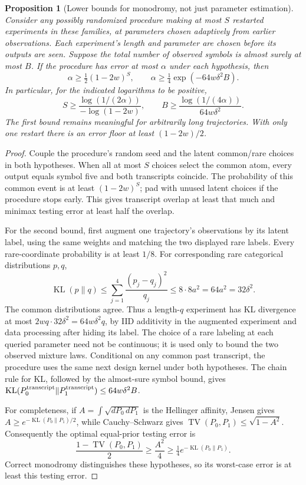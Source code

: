 \documentclass[11pt]{article}
\newtheorem{proposition}[theorem]{Proposition}
\theoremstyle{remark}\newtheorem{remark}[theorem]{Remark}
\newcommand{\TV}{\operatorname{TV}}
\newcommand{\KL}{\operatorname{KL}}
\begin{document}
\begin{proposition}[Lower bounds for monodromy, not just parameter estimation]\label{prop:lower}
Consider any possibly randomized procedure making at most $S$ restarted experiments in these families, at parameters chosen adaptively from earlier observations. Each experiment's length and parameter are chosen before its outputs are seen. Suppose the total number of observed symbols is almost surely at most $B$. If the procedure has error at most $\alpha$ under each hypothesis, then
\[
 \alpha\geq\tfrac12(1-2w)^S,
 \qquad
 \alpha\geq\tfrac14\exp(-64w\delta^2B).
\]
In particular, for the indicated logarithms to be positive,
\[
 S\geq\frac{\log(1/(2\alpha))}{-\log(1-2w)},
 \qquad
 B\geq\frac{\log(1/(4\alpha))}{64w\delta^2}.
\]
The first bound remains meaningful for arbitrarily long trajectories. With only one restart there is an error floor at least $(1-2w)/2$.
\end{proposition}
\begin{proof}
Couple the procedure's random seed and the latent common/rare choices in both hypotheses. When all at most $S$ choices select the common atom, every output equals symbol five and both transcripts coincide. The probability of this common event is at least $(1-2w)^S$; pad with unused latent choices if the procedure stops early. This gives transcript overlap at least that much and minimax testing error at least half the overlap.

For the second bound, first augment one trajectory's observations by its latent label, using the same weights and matching the two displayed rare labels. Every rare-coordinate probability is at least $1/8$. For corresponding rare categorical distributions $p,q$,
\[
 \KL(p\|q)\leq\sum_{j=1}^4\frac{(p_j-q_j)^2}{q_j}
 \leq8\cdot8a^2=64a^2=32\delta^2.
\]
The common distributions agree. Thus a length-$q$ experiment has KL divergence at most $2wq\cdot32\delta^2=64w\delta^2q$, by IID additivity in the augmented experiment and data processing after hiding its label. The choice of a rare labeling at each queried parameter need not be continuous; it is used only to bound the two observed mixture laws. Conditional on any common past transcript, the procedure uses the same next design kernel under both hypotheses. The chain rule for KL, followed by the almost-sure symbol bound, gives
$\KL(P_0^{\rm transcript}\|P_1^{\rm transcript})\leq64w\delta^2B$.

For completeness, if $A=\int\sqrt{dP_0\,dP_1}$ is the Hellinger affinity, Jensen gives $A\geq e^{-\KL(P_0\|P_1)/2}$, while Cauchy--Schwarz gives
$\TV(P_0,P_1)\leq\sqrt{1-A^2}$.
Consequently the optimal equal-prior testing error is
\[
 \frac{1-\TV(P_0,P_1)}2\geq\frac{A^2}{4}
 \geq\tfrac14e^{-\KL(P_0\|P_1)}.
\]
Correct monodromy distinguishes these hypotheses, so its worst-case error is at least this testing error.
\end{proof}
\end{document}
